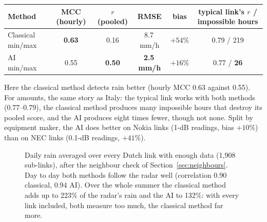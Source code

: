\begin{center}\footnotesize
\begin{tabular}{lccccc}
\toprule
Method & MCC (hourly) & $r$ (pooled) & RMSE & bias & typical link's $r$ / impossible hours\\
\midrule
Classical min/max & \textbf{0.63} & 0.16 & 8.7\,mm/h & $+54\%$ & 0.79 / 219\\
AI min/max        & 0.55 & \textbf{0.50} & \textbf{2.5\,mm/h} & \textbf{$+16\%$} & 0.77 / \textbf{26}\\
\bottomrule
\end{tabular}
\end{center}

Here the classical method detects rain better (hourly MCC 0.63 against 0.55). For amounts, the same story as Italy: the
typical link works with both methods (0.77--0.79), the classical method produces many impossible hours that destroy its
pooled score, and the AI produces eight times fewer, though not none. Split by equipment maker, the AI does better on
Nokia links (1-dB readings, bias $+10\%$) than on NEC links (0.1-dB readings, $+41\%$).

\begin{figure}[h]
\centering
{}
\caption{Daily rain averaged over every Dutch link with enough data (1{,}908 sub-links), after the neighbour check of
Section~\ref{sec:neighbours}. Day to day both methods follow the radar well (correlation 0.90 classical, 0.94 AI). Over the
whole summer the classical method adds up to 223\% of the radar's rain and the AI to 132\%: with every link included,
both measure too much, the classical method far more.}
\label{fig:nl}
\end{figure}

